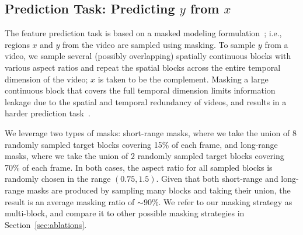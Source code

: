 \documentclass[twocolumn]{fairmeta}
\theoremstyle{plain}
\theoremstyle{definition}
\theoremstyle{remark}
\begin{document}
\subsection{Prediction Task: Predicting $y$ from $x$}
\label{subsec:prediction_task}

The feature prediction task is based on a masked modeling formulation~\citep{he2021masked, tong2022videomae}; i.e., regions $x$ and $y$ from the video are sampled using masking.
To sample $y$ from a video, we sample several (possibly overlapping) spatially continuous blocks with various aspect ratios and repeat the spatial blocks across the entire temporal dimension of the video; $x$ is taken to be the complement.
Masking a large continuous block that covers the full temporal dimension limits information leakage due to the spatial and temporal redundancy of videos, and results in a harder prediction task~\citep{tong2022videomae}.

We leverage two types of masks: short-range masks, where we take the union of $8$ randomly sampled target blocks covering 15\% of each frame, and long-range masks, where we take the union of $2$ randomly sampled target blocks covering 70\% of each frame.
In both cases, the aspect ratio for all sampled blocks is randomly chosen in the range $(0.75, 1.5)$.
Given that both short-range and long-range masks are produced by sampling many blocks and taking their union, the result is an average masking ratio of $\sim90\%$.
We refer to our masking strategy as multi-block, and compare it to other possible masking strategies in Section~\ref{sec:ablations}.
\end{document}
